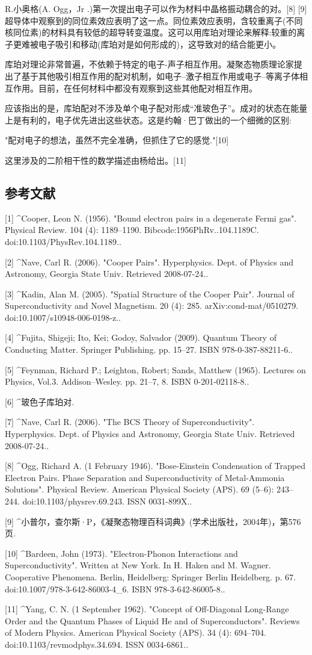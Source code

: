 R.小奥格(A. Ogg，Jr .)第一次提出电子可以作为材料中晶格振动耦合的对。[8] [9]超导体中观察到的同位素效应表明了这一点。同位素效应表明，含较重离子(不同核同位素)的材料具有较低的超导转变温度。这可以用库珀对理论来解释:较重的离子更难被电子吸引和移动(库珀对是如何形成的)，这导致对的结合能更小。

库珀对理论非常普遍，不依赖于特定的电子-声子相互作用。凝聚态物质理论家提出了基于其他吸引相互作用的配对机制，如电子–激子相互作用或电子–等离子体相互作用。目前，在任何材料中都没有观察到这些其他配对相互作用。

应该指出的是，库珀配对不涉及单个电子配对形成“准玻色子”。成对的状态在能量上是有利的，电子优先进出这些状态。这是约翰·巴丁做出的一个细微的区别:

"配对电子的想法，虽然不完全准确，但抓住了它的感觉."[10]

这里涉及的二阶相干性的数学描述由杨给出。[11]

\subsection{参考文献}
[1]
^Cooper, Leon N. (1956). "Bound electron pairs in a degenerate Fermi gas". Physical Review. 104 (4): 1189–1190. Bibcode:1956PhRv..104.1189C. doi:10.1103/PhysRev.104.1189..

[2]
^Nave, Carl R. (2006). "Cooper Pairs". Hyperphysics. Dept. of Physics and Astronomy, Georgia State Univ. Retrieved 2008-07-24..

[3]
^Kadin, Alan M. (2005). "Spatial Structure of the Cooper Pair". Journal of Superconductivity and Novel Magnetism. 20 (4): 285. arXiv:cond-mat/0510279. doi:10.1007/s10948-006-0198-z..

[4]
^Fujita, Shigeji; Ito, Kei; Godoy, Salvador (2009). Quantum Theory of Conducting Matter. Springer Publishing. pp. 15–27. ISBN 978-0-387-88211-6..

[5]
^Feynman, Richard P.; Leighton, Robert; Sands, Matthew (1965). Lectures on Physics, Vol.3. Addison–Wesley. pp. 21–7, 8. ISBN 0-201-02118-8..

[6]
^玻色子库珀对.

[7]
^Nave, Carl R. (2006). "The BCS Theory of Superconductivity". Hyperphysics. Dept. of Physics and Astronomy, Georgia State Univ. Retrieved 2008-07-24..

[8]
^Ogg, Richard A. (1 February 1946). "Bose-Einstein Condensation of Trapped Electron Pairs. Phase Separation and Superconductivity of Metal-Ammonia Solutions". Physical Review. American Physical Society (APS). 69 (5–6): 243–244. doi:10.1103/physrev.69.243. ISSN 0031-899X..

[9]
^小普尔，查尔斯·P，《凝聚态物理百科词典》(学术出版社，2004年)，第576页.

[10]
^Bardeen, John (1973). "Electron-Phonon Interactions and Superconductivity". Written at New York. In H. Haken and M. Wagner. Cooperative Phenomena. Berlin, Heidelberg: Springer Berlin Heidelberg. p. 67. doi:10.1007/978-3-642-86003-4_6. ISBN 978-3-642-86005-8..

[11]
^Yang, C. N. (1 September 1962). "Concept of Off-Diagonal Long-Range Order and the Quantum Phases of Liquid He and of Superconductors". Reviews of Modern Physics. American Physical Society (APS). 34 (4): 694–704. doi:10.1103/revmodphys.34.694. ISSN 0034-6861..